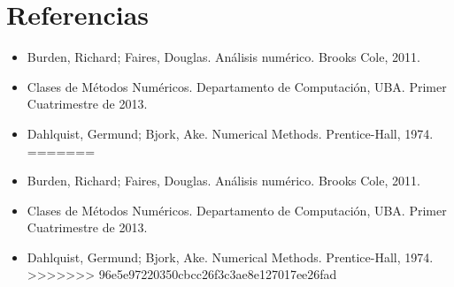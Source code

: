 \section{Referencias}

\begin{itemize}
<<<<<<< HEAD
  \item \nocite {Burden} Burden, Richard; Faires, Douglas. An\'alisis num\'erico. Brooks Cole, 2011.
  \item \nocite {MN} Clases de M\'etodos Num\'ericos. Departamento de Computaci\'on, UBA. Primer Cuatrimestre de 2013.
  \item \nocite {Dahlquist} Dahlquist, Germund; Bjork, Ake. Numerical Methods. Prentice-Hall, 1974.
=======
  \item \nocite {Burden} Burden, Richard; Faires, Douglas. An\'alisis 
num\'erico. Brooks Cole, 2011.
  \item \nocite {MN} Clases de M\'etodos Num\'ericos. Departamento de 
Computaci\'on, UBA. Primer Cuatrimestre de 2013.
  \item \nocite {Dahlquist} Dahlquist, Germund; Bjork, Ake. Numerical Methods. 
Prentice-Hall, 1974.
>>>>>>> 96e5e97220350cbcc26f3c3ae8e127017ee26fad
\end{itemize}
